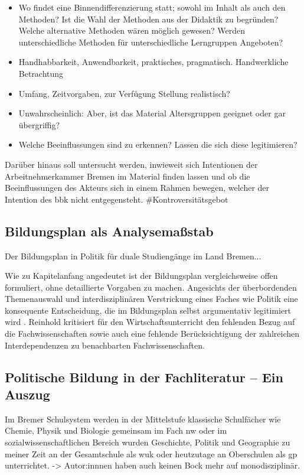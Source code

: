 \begin{itemize}
    \item Wo findet eine Binnendifferenzierung statt; sowohl im Inhalt als auch den Methoden? Ist die Wahl der Methoden aus der Didaktik zu begründen? Welche alternative Methoden wären möglich gewesen? Werden unterschiedliche Methoden für unterschiedliche Lerngruppen Angeboten?
    \item Handhabbarkeit, Anwendbarkeit, praktisches, pragmatisch. Handwerkliche Betrachtung
    \item Umfang, Zeitvorgaben, zur Verfügung Stellung realistisch?
    \item Unwahrscheinlich: Aber, ist das Material Altersgruppen geeignet oder gar übergriffig?
    \item Welche Beeinflussungen sind zu erkennen? Lassen die sich diese legitimieren?
\end{itemize}
Darüber hinaus soll untersucht werden, inwieweit sich Intentionen der Arbeitnehmerkammer Bremen im Material finden lassen und ob die Beeinflussungen des Akteurs sich in einem Rahmen bewegen, welcher der Intention des \gls{bbk} nicht entgegensteht. \#Kontroversitätsgebot 


\subsection{Bildungsplan als Analysemaßstab}
Der Bildungsplan \autocite{bplan} in Politik für duale Studiengänge im Land Bremen...

Wie zu Kapitelanfang angedeutet ist der Bildungsplan vergleichsweise offen formuliert, ohne detaillierte Vorgaben zu machen. Angesichts der überbordenden Themenauswahl und interdisziplinären Verstrickung eines Faches wie Politik eine konsequente Entscheidung, die im Bildungsplan selbst argumentativ legitimiert wird \autocite[diggah, welche Seite habe ich das gelesen]{bplan}. Reinhold \textcite[17-18]{Hedtke2016} kritisiert für den Wirtschaftsunterricht den fehlenden Bezug auf die Fachwissenschaften sowie auch eine fehlende Berücksichtigung der zahlreichen Interdependenzen zu benachbarten Fachwissenschaften. 


\subsection{Politische Bildung in der Fachliteratur -- Ein Auszug}
Im Bremer Schulsystem werden in der Mittelstufe klassische Schulfächer wie Chemie, Physik und Biologie gemeinsam im Fach \gls{nw} \autocite{vogel2010nw} oder im sozialwissenschaftlichen Bereich wurden Geschichte, Politik und Geographie zu meiner Zeit an der Gesamtschule als \gls{wuk} \autocite{vogel2006gs} oder heutzutage an Oberschulen als \gls{gp} \autocite{vogel2010gp} unterrichtet.
->
Autor:innnen haben auch keinen Bock mehr auf monodisziplinär. 

